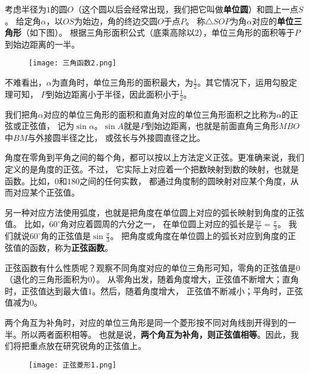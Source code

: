 \documentclass[12pt,UTF8]{ctexbook}
\begin{document}
考虑半径为$1$的圆$O$（这个圆以后会经常出现，我们把它叫做\textbf{单位圆}）和圆上一点$S$。
给定角$\alpha$，以$OS$为始边，角的终边交圆$O$于点$P$。
称$\triangle SOP$为角$\alpha$对应的\textbf{单位三角形}（如下图）。
根据三角形面积公式（底乘高除以$2$），单位三角形的面积等于$P$到始边距离的一半。

\begin{figure}[H] %
    \vspace{4pt}
    \centering
    \texttt{[image: 三角函数2.png]}
\end{figure}

不难看出，$\alpha$为直角时，单位三角形的面积最大，为$\frac{1}{2}$。其它情况下，运用勾股定理可知，
$P$到始边距离小于半径，因此面积小于$\frac{1}{2}$。

我们把角$\alpha$对应的单位三角形的面积和直角对应的单位三角形面积之比称为$\alpha$的正弦或正弦值，
记为$\sin \alpha$。$\sin A$就是$P$到始边距离，也就是前面直角三角形$MBO$中$BM$与外接圆半径之比，
或弦长与外接圆直径之比。

角度在零角到平角之间的每个角，都可以按以上方法定义正弦。更准确来说，我们定义的是角度的正弦。不过，
它实际上对应着一个把数映射到数的映射，也就是函数。比如，$0$和$180$之间的任何实数，
都通过角度制的圆映射对应某个角度，从而对应某个正弦值。

另一种对应方法使用弧度，也就是把角度在单位圆上对应的弧长映射到角度的正弦值。
比如，$60^\circ$角对应着圆周的六分之一，
在单位圆上对应的弧长是$\frac{2\pi}{6} = \frac{\pi}{3}$。
我们就说$60^\circ$角的正弦值是$\sin \frac{\pi}{3}$。
把角度或角度在单位圆上的弧长对应到角度的正弦值的函数，称为\textbf{正弦函数}。

正弦函数有什么性质呢？观察不同角度对应的单位三角形可知，零角的正弦值是$0$（退化的三角形面积为$0$）。
从零角出发，随着角度增大，正弦值不断增大；直角时，正弦值达到最大值$1$。然后，随着角度增大，
正弦值不断减小；平角时，正弦值减为$0$。

两个角互为补角时，对应的单位三角形是同一个菱形按不同对角线剖开得到的一半。所以两者面积相等。
也就是说，\textbf{两个角互为补角，则正弦值相等}。因此，我们将把重点放在研究锐角的正弦值上。

\begin{figure}[H] %
    \vspace{4pt}
    \centering
    \texttt{[image: 正弦菱形1.png]}
\end{figure}
\end{document}
